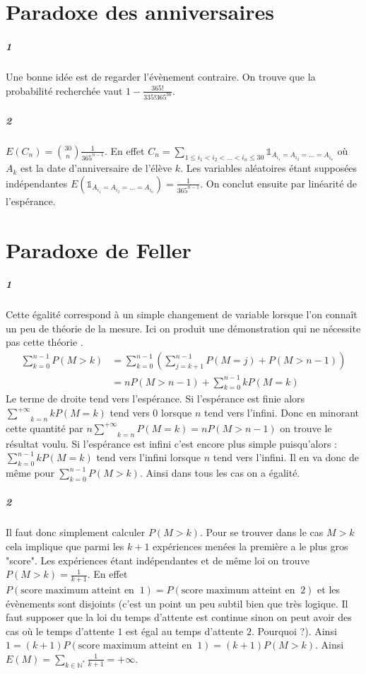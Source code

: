 \documentclass[10pt,a4paper]{article}
\begin{document}
\section{Paradoxe des anniversaires}
\subparagraph{1}Une bonne idée est de regarder l'évènement contraire. On trouve que la probabilité recherchée vaut $1- \frac{365!}{335!365^{30}}$.
\subparagraph{2}$E(C_n) = \binom{30}{n}\frac{1}{365^{n-1}}$. En effet $C_n = \underset{1\le i_1 <i_2<\dots <i_n \le 30}{\sum} \mathbb{1}_{A_{i_1}=A_{i_2}=\dots=A_{i_n}}$ où $A_k$ est la date d'anniversaire de l'élève $k$. Les variables aléatoires étant supposées indépendantes $E(\mathbb{1}_{A_{i_1}=A_{i_2}=\dots=A_{i_n}}) = \frac{1}{365^{n-1}}$. On conclut ensuite par linéarité de l'espérance.

\section{Paradoxe de Feller}
\subparagraph{1}Cette égalité correspond à un simple changement de variable lorsque l'on connaît un peu de théorie de la mesure. Ici on produit une démonstration qui ne nécessite pas cette théorie .
\begin{equation}
\begin{aligned}
\sum_{k=0}^{n-1}P(M>k)&= \sum_{k=0}^{n-1} \left( \sum_{j=k+1}^{n-1}P(M=j) + P(M>n-1) \right) \\
&= nP(M>n-1) + \sum_{k=0}^{n-1}kP(M=k) 
\end{aligned}
\end{equation}
Le terme de droite tend vers l'espérance. Si l'espérance est finie alors $\underset{k=n}{\overset{+\infty}{\sum}}kP(M=k)$ tend vers $0$ lorsque $n$ tend vers l'infini. Donc en minorant cette quantité par $n\underset{k=n}{\overset{+\infty}{\sum}}P(M=k)=nP(M>n-1)$ on trouve le résultat voulu. Si l'espérance est infini c'est encore plus simple puisqu'alors : $\sum_{k=0}^{n-1}kP(M=k) $ tend vers l'infini lorsque $n$ tend vers l'infini. Il en va donc de même pour $\sum_{k=0}^{n-1}P(M>k)$. Ainsi dans tous les cas on a égalité.
\subparagraph{2}Il faut donc simplement calculer $P(M>k)$. Pour se trouver dans le cas $M>k$ cela implique que parmi les $k+1$ expériences menées la première a le plus gros "score". Les expériences étant indépendantes et de même loi on trouve $P(M>k)= \frac{1}{k+1}$. En effet $P(\text{score maximum atteint en } \ 1) = P(\text{score maximum atteint en } \ 2)$ et les évènements sont disjoints (c'est un point un peu subtil bien que très logique. Il faut supposer que la loi du temps d'attente est continue sinon on peut avoir des cas où le temps d'attente $1$ est égal au temps d'attente $2$. Pourquoi ?). Ainsi $1= (k+1)P(\text{score maximum atteint en } \ 1)=(k+1)P(M>k)$. Ainsi $E(M) = \underset{k \in \mathbb{N}^*}{\sum}\frac{1}{k+1} = +\infty$.
\end{document}
